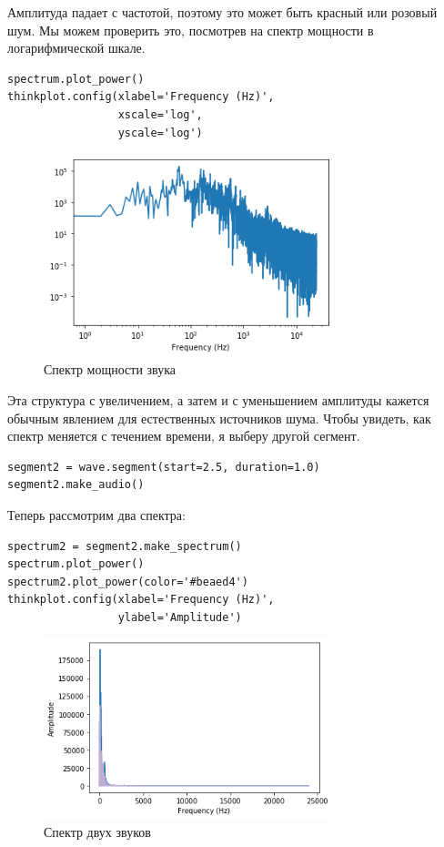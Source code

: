 \documentclass[a4paper,12pt]{report}
\begin{document}
Амплитуда падает с частотой, поэтому это может быть красный или розовый шум. Мы можем проверить это, посмотрев на спектр мощности в логарифмической шкале.

\begin{lstlisting}[caption=Спектр мощности звука]
spectrum.plot_power()
thinkplot.config(xlabel='Frequency (Hz)',
                 xscale='log', 
                 yscale='log')
\end{lstlisting}

\begin{figure}[H]
        \centering
        \includegraphics[width=0.75\textwidth]{lab4_fig1_2.png}
        \caption{Спектр мощности звука}
        \label{fig:lab4_fig1_2}
\end{figure}

Эта структура с увеличением, а затем и с уменьшением амплитуды кажется обычным явлением для естественных источников шума. Чтобы увидеть, как спектр меняется с течением времени, я выберу другой сегмент.

\begin{lstlisting}[caption=Выбор другого сегмента звука]
segment2 = wave.segment(start=2.5, duration=1.0)
segment2.make_audio()
\end{lstlisting}

Теперь рассмотрим два спектра:

\begin{lstlisting}[caption=Спектр двух звуков]
spectrum2 = segment2.make_spectrum()
spectrum.plot_power()
spectrum2.plot_power(color='#beaed4')
thinkplot.config(xlabel='Frequency (Hz)',
                 ylabel='Amplitude')
\end{lstlisting}

\begin{figure}[H]
        \centering
        \includegraphics[width=0.75\textwidth]{lab4_fig1_3.png}
        \caption{Спектр двух звуков}
        \label{fig:lab4_fig1_3}
\end{figure}
\end{document}
